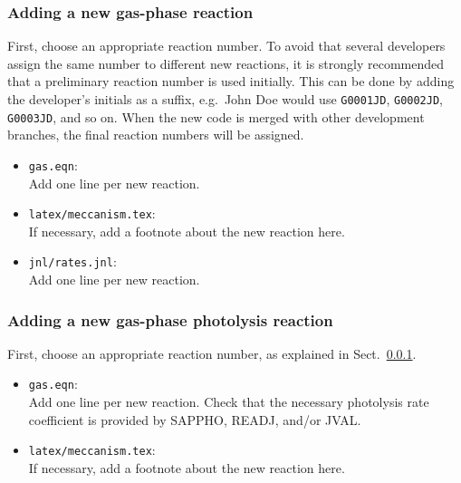 \documentclass[twoside]{article}
\def\nosep{\setlength\parsep{0mm}\setlength\topsep{0mm}\setlength\itemsep{0mm}}
\begin{document}
\subsubsection{Adding a new gas-phase reaction}
\label{sec:addgprxn}

First, choose an appropriate reaction number. To avoid that several
developers assign the same number to different new reactions, it is
strongly recommended that a preliminary reaction number is used
initially. This can be done by adding the developer's initials as a
suffix, e.g.\ John Doe would use \verb|G0001JD|, \verb|G0002JD|,
\verb|G0003JD|, and so on. When the new code is merged with other
development branches, the final reaction numbers will be assigned.

\begin{itemize}\nosep
\item \verb|gas.eqn|:\\
  Add one line per new reaction.
\end{itemize}

\begin{itemize}\nosep
\item \verb|latex/meccanism.tex|:\\
  If necessary, add a footnote about the new reaction here.
\end{itemize}

\begin{itemize}\nosep
\item \verb|jnl/rates.jnl|:\\
  Add one line per new reaction.
\end{itemize}

\subsubsection{Adding a new gas-phase photolysis reaction}

First, choose an appropriate reaction number, as explained in
Sect.~\ref{sec:addgprxn}.

\begin{itemize}\nosep
\item \verb|gas.eqn|:\\
  Add one line per new reaction. Check that the necessary photolysis
  rate coefficient is provided by SAPPHO, READJ, and/or JVAL.
\end{itemize}

\begin{itemize}\nosep
\item \verb|latex/meccanism.tex|:\\
  If necessary, add a footnote about the new reaction here.
\end{itemize}
\end{document}
